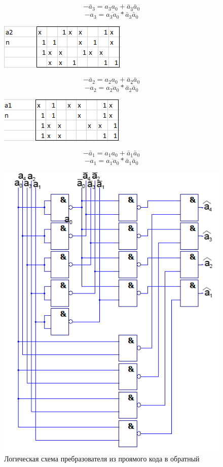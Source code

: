 \documentclass[a4paper,14pt]{article}
\begin{document}
$$-\bar{a}_3 = a_3 a_0 + \bar{a}_3\bar{a}_0$$
$$-a_3 = \overline{a_3 a_0} * \overline{\bar{a}_3\bar{a}_0}$$



\begin{figure}[H]
	\centering
	\includegraphics[width=0.5\linewidth]{images2/preobr_003}
	\caption{}
	\label{fig:preobr003}
\end{figure}


$$-\bar{a}_2 = a_2 a_0 + \bar{a}_2\bar{a}_0$$
$$-a_2 = \overline{a_2 a_0} * \overline{\bar{a}_2\bar{a}_0}$$



\begin{figure}[H]
	\centering
	\includegraphics[width=0.5\linewidth]{images2/preobr_004}
	\caption{}
	\label{fig:preobr004}
\end{figure}


$$-\bar{a}_1 = a_1 a_0 + \bar{a}_1\bar{a}_0$$
$$-a_1 = \overline{a_1 a_0} * \overline{\bar{a}_1\bar{a}_0}$$

\begin{figure}[H]
	\centering
	\includegraphics[width=0.6\linewidth]{images/preobr_sh}
	\caption{Логическая схема пребразователя из проямого кода в обратный}
	\label{fig:preobr_sh}
\end{figure}
\end{document}
